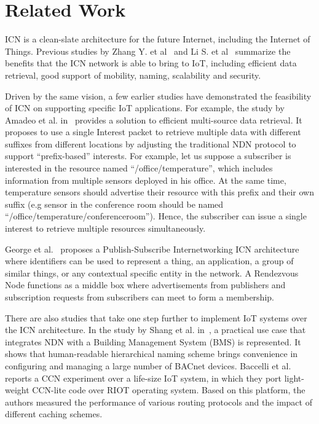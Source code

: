 \section{Related Work}
\label{sec:related}

ICN is a clean-slate architecture for the future Internet, including the Internet of Things. Previous studies by Zhang Y. et al~\cite{zhang2013icn} and Li S. et al~\cite{li2014comparative} summarize the benefits that the ICN network is able to bring to IoT, including efficient data retrieval, good support of mobility, naming, scalability and security.


Driven by the same vision, a few earlier studies have demonstrated the feasibility of ICN on supporting specific IoT applications. For example, the study by Amadeo et al. in~\cite{amadeo2014multi} provides a solution to efficient multi-source data retrieval. It proposes to use a single Interest packet to retrieve multiple data with different suffixes from different locations by adjusting the traditional NDN protocol to support ``prefix-based'' interests. For example, let us suppose a subscriber is interested in the resource named ``/office/temperature'', which includes  information from multiple sensors deployed in his office. At the same time, temperature sensors should advertise their resource with this prefix and their own suffix (e.g sensor in the conference room should be named ``/office/temperature/conferenceroom''). Hence, the subscriber can issue a single interest to retrieve multiple resources simultaneously.


George et al.~\cite{polyzos2015building} proposes a Publish-Subscribe Internetworking ICN architecture
where identifiers can be used to represent a thing, an application, a group of similar things, or any contextual specific entity in the network. A Rendezvous Node functions as a middle box where advertisements from publishers and subscription requests from subscribers can meet to form a membership.


There are also studies that take one step further to implement IoT systems over the ICN architecture. In the study by Shang et al. in~\cite{shang2014securing}, a practical use case that integrates NDN with a Building Management System (BMS) is represented. It shows that human-readable hierarchical naming scheme brings convenience in configuring and managing a large number of BACnet devices. Baccelli et al.~\cite{baccelli2014information} reports a CCN experiment  over a life-size IoT system, in which they port light-weight CCN-lite code over RIOT operating system. Based on this platform, the authors measured the performance of various routing protocols and the impact of different caching schemes.

